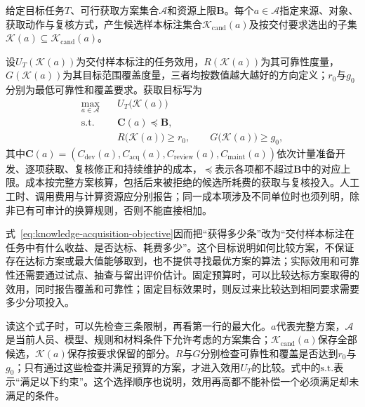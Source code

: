 \begin{definition}[监督信号获取目标]
  \label{def:knowledge-acquisition-objective}
  给定目标任务$T$、可行获取方案集合$\mathcal{A}$和资源上限$\bm{B}$。每个$a\in\mathcal{A}$指定来源、对象、获取动作与复核方式，产生候选样本标注集合$\mathcal{K}_{\mathrm{cand}}(a)$及按交付要求选出的子集$\mathcal{K}(a)\subseteq\mathcal{K}_{\mathrm{cand}}(a)$。

  设$U_T(\mathcal{K}(a))$为交付样本标注的任务效用，$R(\mathcal{K}(a))$为其可靠性度量，$G(\mathcal{K}(a))$为其目标范围覆盖度量，三者均按数值越大越好的方向定义；$r_0$与$g_0$分别为最低可靠性和覆盖要求。获取目标写为
  \begin{equation}
    \begin{aligned}
      \max_{a\in\mathcal{A}}\quad
      & U_T\bigl(\mathcal{K}(a)\bigr) \\
      \text{s.t.}\quad
      & \bm{C}(a)\preceq\bm{B}, \\
      & R\bigl(\mathcal{K}(a)\bigr)\geq r_0,\qquad
        G\bigl(\mathcal{K}(a)\bigr)\geq g_0,
    \end{aligned}
    \label{eq:knowledge-acquisition-objective}
  \end{equation}
  其中$\bm{C}(a)=(C_{\mathrm{dev}}(a),C_{\mathrm{acq}}(a),C_{\mathrm{review}}(a),C_{\mathrm{maint}}(a))$依次计量准备开发、逐项获取、复核修正和持续维护的成本，$\preceq$表示各项都不超过$\bm{B}$中的对应上限。成本按完整方案核算，包括后来被拒绝的候选所耗费的获取与复核投入。人工工时、调用费用与计算资源应分别报告；同一成本项涉及不同单位时也须列明，除非已有可审计的换算规则，否则不能直接相加。
\end{definition}

式~\eqref{eq:knowledge-acquisition-objective}因而把“获得多少条”改为“交付样本标注在任务中有什么收益、是否达标、耗费多少”。这个目标说明如何比较方案，不保证存在达标方案或最大值能够取到，也不提供寻找最优方案的算法；实际效用和可靠性还需要通过试点、抽查与留出评价估计。固定预算时，可以比较达标方案取得的效用，同时报告覆盖和可靠性；固定目标效果时，则反过来比较达到相同要求需要多少分项投入。

读这个式子时，可以先检查三条限制，再看第一行的最大化。$a$代表完整方案，$\mathcal{A}$是当前人员、模型、规则和材料条件下允许考虑的方案集合；$\mathcal{K}_{\mathrm{cand}}(a)$保存全部候选，$\mathcal{K}(a)$保存按要求保留的部分。$R$与$G$分别检查可靠性和覆盖是否达到$r_0$与$g_0$；只有通过这些检查并满足预算的方案，才进入效用$U_T$的比较。式中的$\text{s.t.}$表示“满足以下约束”。这个选择顺序也说明，效用再高都不能补偿一个必须满足却未满足的条件。

